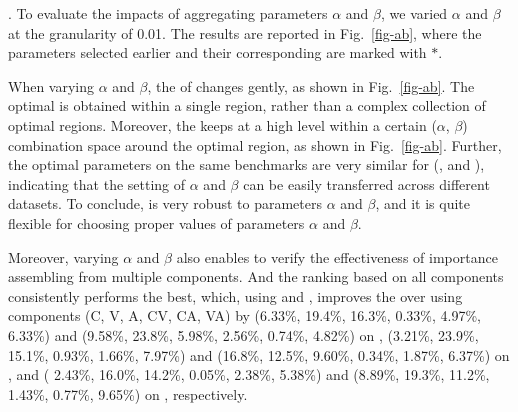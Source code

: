 .
To evaluate the impacts of aggregating parameters $\alpha$ and $\beta$, we varied $\alpha$ and $\beta$ at the granularity of 0.01.
The results are reported in Fig.~\ref{fig-ab}, where the parameters selected earlier and their corresponding \PairAcc are marked with $*$.

When varying $\alpha$ and $\beta$, the \PairAcc of \ensemblerank changes gently, as shown in Fig.~\ref{fig-ab}.
The optimal \PairAcc is obtained within a single region, rather than a complex collection of optimal regions.
%
Moreover, the \PairAcc keeps at a high level within a certain ($\alpha$, $\beta$) combination space around the optimal region, as shown in Fig.~\ref{fig-ab}.
%
Further, the optimal parameters on the same benchmarks are very similar for (\aan, \aminer and \magdata), indicating that the setting of $\alpha$ and $\beta$ can be easily transferred across different datasets.
To conclude, \ensemblerank is very robust to parameters $\alpha$ and $\beta$, and it is quite flexible for choosing proper values of parameters $\alpha$ and $\beta$.

Moreover, varying $\alpha$ and $\beta$ also enables to verify the effectiveness of importance assembling from multiple components.
And the ranking based on all components consistently performs the best, which, using \recom and \fcita, improves the \PairAcc over using components (C, V, A, CV, CA, VA) by (6.33\%, 19.4\%, 16.3\%, 0.33\%, 4.97\%, 6.33\%) and (9.58\%, 23.8\%, 5.98\%, 2.56\%, 0.74\%, 4.82\%) on \aan, (3.21\%, 23.9\%, 15.1\%, 0.93\%, 1.66\%, 7.97\%) and (16.8\%, 12.5\%, 9.60\%, 0.34\%, 1.87\%, 6.37\%) on \aminer, and ( 2.43\%, 16.0\%, 14.2\%, 0.05\%, 2.38\%, 5.38\%) and (8.89\%, 19.3\%, 11.2\%, 1.43\%, 0.77\%, 9.65\%) on \magdata, respectively.

